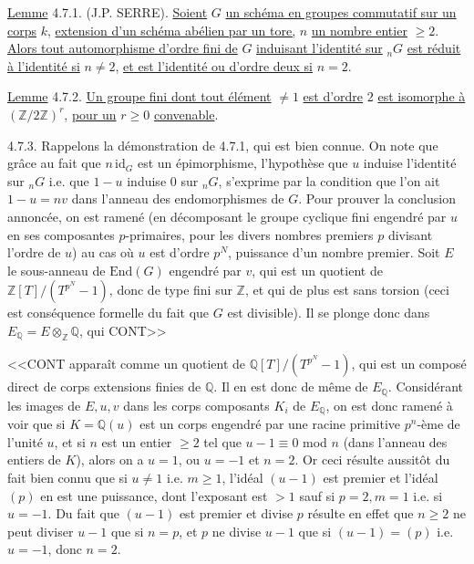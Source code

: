 \underline{Lemme} 4.7.1. (J.P. SERRE). \underline{Soient} $G$ \underline{un schéma en groupes commutatif sur un corps} $k$, \underline{extension d'un schéma abélien par un tore,} $n$ \underline{un nombre entier} $\geq 2$. \underline{Alors tout automorphisme d'ordre fini de} $G$ \underline{induisant l'identité sur} ${}_nG$ \underline{est réduit à l'identité si} $n \neq 2$, \underline{et est l'identité ou d'ordre deux si} $n = 2$.

\underline{Lemme} 4.7.2. \underline{Un groupe fini dont tout élément} $\neq 1$ \underline{est d'ordre} $2$ \underline{est isomorphe à} $(\mathbb{Z}/2\mathbb{Z})^r$, \underline{pour un} $r \geq 0$ \underline{convenable}.

4.7.3. Rappelons la démonstration de 4.7.1, qui est bien connue. On note que grâce au fait que $n\,\mathrm{id}_G$ est un épimorphisme, l'hypothèse que $u$ induise l'identité sur ${}_nG$ i.e. que $1 - u$ induise $0$ sur ${}_nG$, s'exprime par la condition que l'on ait $1 - u = nv$ dans l'anneau des endomorphismes de $G$. Pour prouver la conclusion annoncée, on est ramené (en décomposant le groupe cyclique fini engendré par $u$ en ses composantes $p$-primaires, pour les divers nombres premiers $p$ divisant l'ordre de $u$) au cas où $u$ est d'ordre $p^N$, puissance d'un nombre premier. Soit $E$ le sous-anneau de $\mathrm{End}(G)$ engendré par $v$, qui est un quotient de $\mathbb{Z}[T]/(T^{p^N}-1)$, donc de type fini sur $\mathbb{Z}$, et qui de plus est sans torsion (ceci est conséquence formelle du fait que $G$ est divisible). Il se plonge donc dans $E_{\mathbb{Q}} = E\otimes_{\mathbb{Z}} \mathbb{Q}$, qui CONT>>



<<CONT apparaît comme un quotient de $\mathbb{Q}[T]/(T^{p^N}-1)$, qui est un composé direct de corps extensions finies de $\mathbb{Q}$. Il en est donc de même de $E_{\mathbb{Q}}$. Considérant les images de $E,u,v$ dans les corps composants $K_i$ de $E_{\mathbb{Q}}$, on est donc ramené à voir que si $K = \mathbb{Q}(u)$ est un corps engendré par une racine primitive $p^n$-ème de l'unité $u$, et si $n$ est un entier $\geq 2$ tel que $u-1 \equiv 0$ mod $n$ (dans l'anneau des entiers de $K$), alors on a $u=1$, ou $u=-1$ et $n=2$. Or ceci résulte aussitôt du fait bien connu que si $u \neq 1$ i.e. $m \geq 1$, l'idéal $(u-1)$ est premier et l'idéal $(p)$ en est une puissance, dont l'exposant est $> 1$ sauf si $p=2,m=1$ i.e. si $u=-1$. Du fait que $(u-1)$ est premier et divise $p$ résulte en effet que $n \geq 2$ ne peut diviser $u-1$ que si $n=p$, et $p$ ne divise $u-1$ que si $(u-1) = (p)$ i.e. $u = -1$, donc $n = 2$.

